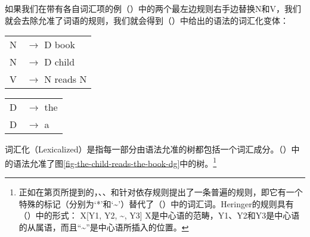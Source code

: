 \z
\addlines[2]
如果我们在带有各自词汇项的例（）中的两个最左边规则右手边替换N和V，我们就会去除允准了词语的规则，我们就会得到（）中给出的语法的词汇化变体：
\ea
\begin{tabular}[t]{@{}l@{ }l}
{N} & {$\to$ D book}\\          
{N} & {$\to$ D child}\\          
{V}  & {$\to$ N reads N}
\end{tabular}\hspace{1.5cm}%
\begin{tabular}[t]{@{}l@{ }l}
{D}  & {$\to$ the}\\
{D}  & {$\to$ a}\\
\end{tabular}
\z
词汇化（Lexicalized）是指每一部分由语法允准的树都包括一个词汇成分。（）中的语法允准了图\ref{fig-the-child-reads-the-book-dg}中的树。\footnote{\label{fn-flat-dg-rules}%
正如在第\pageref{page-rule-format-dg}页所提到的，\citet[]{Gaifman65a}、\citet[]{Hays64a-u}、\citet[]{Baumgaertner70a}和\citet[]{Heringer96a-u}针对依存规则提出了一条普遍的规则，即它有一个特殊的标记（分别为`*'和`\textasciitilde'）替代了（）中的词汇词。Heringer的规则具有（）中的形式：
\ea
X[Y1, Y2, \textasciitilde, Y3]
\z
X是中心语的范畴，Y1、Y2和Y3是中心语的从属语，而且“\textasciitilde”是中心语所插入的位置。
}

